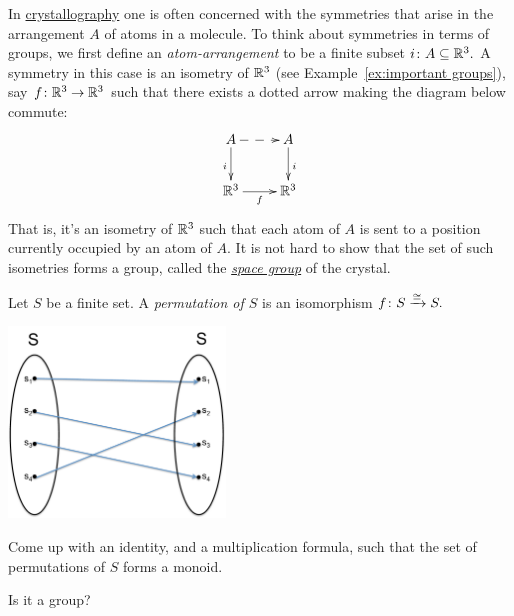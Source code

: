 \documentclass[../main/CT4S-EN-RU]{subfiles}
\begin{document}
\begin{exampleRUS}\label{ex:important groups}
\end{exampleRUS}

\begin{applicationENG}\label{app:groups for symmetry}
In \href{http://en.wikipedia.org/wiki/Crystallography}{\text crystallography} one is often concerned with the symmetries that arise in the arrangement $A$ of atoms in a molecule. To think about symmetries in terms of groups, we first define an {\em atom-arrangement} to be a finite subset $i\colon A\subseteq{\mathbb R}^3.$ A symmetry in this case is an isometry of ${\mathbb R}^3$ (see Example~\ref{ex:important groups}), say $f\colon{\mathbb R}^3\rightarrow{\mathbb R}^3$ such that there exists a dotted arrow making the diagram below commute:
$$
\xymatrix{A\ar@{-->}[r]\ar[d]_i&A\ar[d]^i\\\RR^3\ar[r]_f&\RR^3}
$$
That is, it's an isometry of ${\mathbb R}^3$ such that each atom of $A$ is sent to a position currently occupied by an atom of $A.$ It is not hard to show that the set of such isometries forms a group, called the \href{http://en.wikipedia.org/wiki/Space_group}{\em space group} of the crystal.
\end{applicationENG}

\begin{applicationRUS}\label{app:groups for symmetry}
\end{applicationRUS}

\begin{exerciseENG}\label{exc:permutation}
Let $S$ be a finite set. A {\em permutation of $S$} is an isomorphism $f\colon S\xrightarrow{\cong}S.$ 
\begin{center}
\parbox{2.3in}{
\includegraphics[height=2in]{SetPermutation}}
\end{center}
\sexc Come up with an identity, and a  multiplication formula, such that the set of permutations of $S$ forms a monoid. 
\item Is it a group?
\endsexc
\end{exerciseENG}
\end{document}
